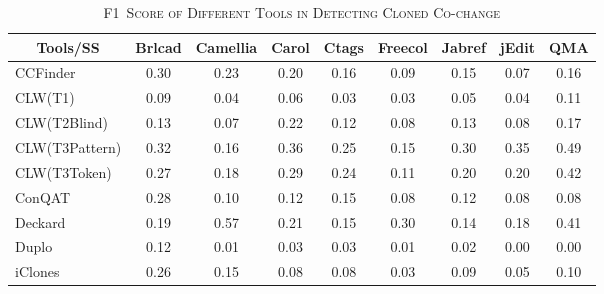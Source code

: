 \documentclass[review]{elsarticle}
\begin{document}
\begin{table}[]
\centering
\small\addtolength{\tabcolsep}{-4pt}
\vspace{2mm}
\caption{\textsc{F1~Score of Different Tools in Detecting Cloned Co-change}}
\label{tab:detection-f1-score}
\begin{tabular}{|l|c|c|c|c|c|c|c|c|}
\hline
\multicolumn{1}{|c|}{\textbf{Tools/SS}} & \textbf{Brlcad} & \textbf{Camellia} & \textbf{Carol} & \textbf{Ctags} & \textbf{Freecol} & \textbf{Jabref} & \textbf{jEdit} & \textbf{QMA} \\ \hline
CCFinder                                & 0.30            & 0.23              & 0.20           & 0.16           & 0.09             & 0.15            & 0.07           & 0.16         \\ \hline
CLW(T1)                                 & 0.09            & 0.04              & 0.06           & 0.03           & 0.03             & 0.05            & 0.04           & 0.11         \\ \hline
CLW(T2Blind)                            & 0.13            & 0.07              & 0.22           & 0.12           & 0.08             & 0.13            & 0.08           & 0.17         \\ \hline
CLW(T3Pattern)                          & 0.32            & 0.16              & 0.36           & 0.25           & 0.15             & 0.30            & 0.35           & 0.49         \\ \hline
CLW(T3Token)                            & 0.27            & 0.18              & 0.29           & 0.24           & 0.11             & 0.20            & 0.20           & 0.42         \\ \hline
ConQAT                                  & 0.28            & 0.10              & 0.12           & 0.15           & 0.08             & 0.12            & 0.08           & 0.08         \\ \hline
Deckard                                 & 0.19            & 0.57              & 0.21           & 0.15           & 0.30             & 0.14            & 0.18           & 0.41         \\ \hline
Duplo                                   & 0.12            & 0.01              & 0.03           & 0.03           & 0.01             & 0.02            & 0.00           & 0.00         \\ \hline
iClones                                 & 0.26            & 0.15              & 0.08           & 0.08           & 0.03             & 0.09            & 0.05           & 0.10         \\ \hline

\end{tabular}
\end{table}
\end{document}
